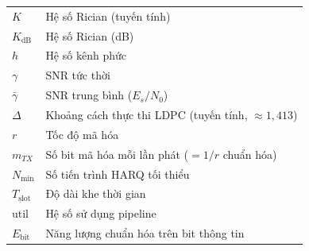 \begin{tabular}{l l}
\hspace{1cm} $K$          & \hspace{1cm} Hệ số Rician (tuyến tính) \\
\hspace{1cm} $K_{\text{dB}}$ & \hspace{1cm} Hệ số Rician (dB) \\
\hspace{1cm} $h$          & \hspace{1cm} Hệ số kênh phức \\
\hspace{1cm} $\gamma$     & \hspace{1cm} SNR tức thời \\
\hspace{1cm} $\bar{\gamma}$ & \hspace{1cm} SNR trung bình ($E_s/N_0$) \\
\hspace{1cm} $\Delta$     & \hspace{1cm} Khoảng cách thực thi LDPC (tuyến tính, $\approx 1{,}413$) \\
\hspace{1cm} $r$          & \hspace{1cm} Tốc độ mã hóa \\
\hspace{1cm} $m_{TX}$     & \hspace{1cm} Số bit mã hóa mỗi lần phát ($= 1/r$ chuẩn hóa) \\
\hspace{1cm} $N_{\min}$   & \hspace{1cm} Số tiến trình HARQ tối thiểu \\
\hspace{1cm} $T_{\text{slot}}$ & \hspace{1cm} Độ dài khe thời gian \\
\hspace{1cm} $\text{util}$ & \hspace{1cm} Hệ số sử dụng pipeline \\
\hspace{1cm} $E_{\text{bit}}$   & \hspace{1cm} Năng lượng chuẩn hóa trên bit thông tin \\
\end{tabular}

\newpage
